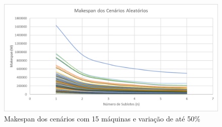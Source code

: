 \begin{figure}[!ht]
    \centering
    \includegraphics[width=12cm]{Resultados/Figuras/M15_50}
    \caption{Makespan dos cenários com 15 máquinas e variação de até 50\%}
    \label{fig:M15_50}
\end{figure}